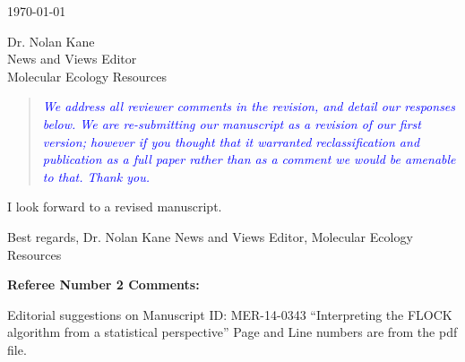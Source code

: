 \documentclass[11pt]{letter}
\newcommand{\reply}[1]{\begin{quotation}\small\sl\textcolor{blue}{#1}\end{quotation}}
\begin{document}
\begin{letter}{ \today 

Dr. Nolan Kane\\
News and Views Editor\\
Molecular Ecology Resources \\
}
\reply{We address all reviewer comments in the revision, and detail our responses below.  We are re-submitting
our manuscript as a revision of our first version; however if you thought that it warranted
reclassification and publication as
a full paper rather than as a comment we would be amenable to that.  Thank you.}

I look forward to a revised manuscript.

Best regards,
Dr. Nolan Kane
News and Views Editor, Molecular Ecology Resources



{\bf Referee Number 2 Comments:}

Editorial suggestions on Manuscript ID: MER-14-0343 ``Interpreting the FLOCK algorithm from a statistical perspective''
Page and Line numbers are from the pdf file.
\begin{itemize}


\end{itemize}
\end{letter}
\end{document}
